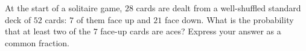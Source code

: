 At the start of a solitaire game, $28$ cards are dealt from a well-shuffled standard deck of $52$ cards: $7$ of them face up and $21$ face down. What is the probability that at least two of the $7$ face-up cards are aces? Express your answer as a common fraction.

